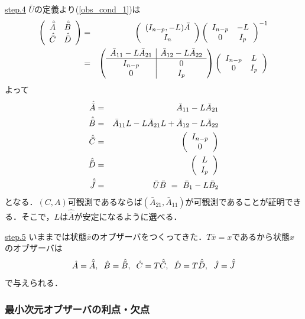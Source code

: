 \noindent \underline{step.4}
$\bar{U}$の定義より(\ref{obs_cond_1})は
\begin{eqnarray}
   \bmatrix{cc}
	\hat{\bar{A}} & \hat{\bar{B}} \\
	\hat{\bar{C}} & \hat{\bar{D}}
   \ematrix
   & = & 	   \bmatrix{c}
		( I_{n-p}, -L) \bar{A} \\
		I_{n}
	   \ematrix
	   \bmatrix{cc}
		I_{n-p} & -L \\
		0 &  I_{p} 
	   \ematrix ^{-1}
\nonumber \\
   & = &    \bmatrix{c|c}
		\bar{A}_{11} - L \bar{A}_{21} &
			\bar{A}_{12} - L \bar{A}_{22} \\
		\hline
		I_{n-p}  & 0 \\
		0        & I_{p}
	   \ematrix
	   \bmatrix{cc}
		I_{n-p} & L \\
		0 &  I_{p} 
	   \ematrix 
\end{eqnarray}
よって
\begin{eqnarray}
   \hat{\bar{A}} & = & \bar{A}_{11} - L \bar{A}_{21}
\label{temp12}
\\
   \hat{\bar{B}} & = & \bar{A}_{11} L - L \bar{A}_{21} L 
				+ \bar{A}_{12} - L \bar{A}_{22}
\\
   \hat{\bar{C}} & = & \bmatrix{c}
				I_{n-p} \\
				0 
			\ematrix
\\
   \hat{\bar{D}} & = & \bmatrix{c}
				L  \\
				I_{p} 
			\ematrix
\\
   \hat{\bar{J}} & = & \bar{U} \bar{B}
		 \ = \ \bar{B}_1 - L \bar{B}_2
\end{eqnarray}
となる．$(C,A)$可観測であるならば$(\bar{A}_{21},\bar{A}_{11})$が可観測であることが証明できる．そこで，$L$は$\hat{\bar{A}}$が安定になるように選べる．

\noindent \underline{step.5}
いままでは状態$\bar{x}$のオブザーバをつくってきた．$T \bar{x} = x$であるから状態$x$のオブザーバは
\begin{equation}
   \hat{A} = \hat{\bar{A}}
, \hspace{2mm}
   \hat{B} = \hat{\bar{B}}
, \hspace{2mm}
   \hat{C} = T \hat{\bar{C}}
, \hspace{2mm}
   \hat{D} = T \hat{\bar{D}}
, \hspace{2mm}
   \hat{J} = \hat{\bar{J}}
\end{equation}
で与えられる．

\subsubsection{最小次元オブザーバの利点・欠点}

